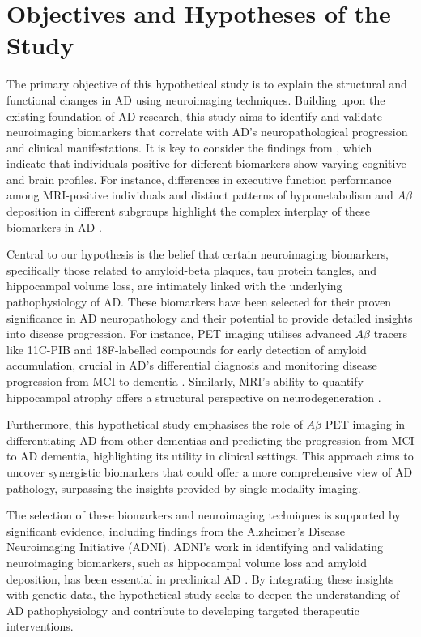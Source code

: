 \documentclass[10pt]{article}
\begin{document}
\begin{sloppypar}
  \section{Objectives and Hypotheses of the Study}
  \label{sec:objectives-and-hypotheses}

  The primary objective of this hypothetical study is to explain the structural and functional changes in AD using neuroimaging techniques. Building upon the existing foundation of AD research, this study aims to identify and validate neuroimaging biomarkers that correlate with AD’s neuropathological progression and clinical manifestations. It is key to consider the findings from \cite{besson_cognitive_2015}, which indicate that individuals positive for different biomarkers show varying cognitive and brain profiles. For instance, differences in executive function performance among MRI-positive individuals and distinct patterns of hypometabolism and $A\beta$ deposition in different subgroups highlight the complex interplay of these biomarkers in AD \citep{besson_cognitive_2015}.

  Central to our hypothesis is the belief that certain neuroimaging biomarkers, specifically those related to amyloid-beta plaques, tau protein tangles, and hippocampal volume loss, are intimately linked with the underlying pathophysiology of AD. These biomarkers have been selected for their proven significance in AD neuropathology and their potential to provide detailed insights into disease progression. For instance, PET imaging utilises advanced $A\beta$ tracers like 11C-PIB and 18F-labelled compounds for early detection of amyloid accumulation, crucial in AD’s differential diagnosis and monitoring disease progression from MCI to dementia \citep{bao_pet_2021}. Similarly, MRI’s ability to quantify hippocampal atrophy offers a structural perspective on neurodegeneration \citep{besson_cognitive_2015}.

  Furthermore, this hypothetical study emphasises the role of $A\beta$ PET imaging in differentiating AD from other dementias and predicting the progression from MCI to AD dementia, highlighting its utility in clinical settings. This approach aims to uncover synergistic biomarkers that could offer a more comprehensive view of AD pathology, surpassing the insights provided by single-modality imaging.

  The selection of these biomarkers and neuroimaging techniques is supported by significant evidence, including findings from the Alzheimer’s Disease Neuroimaging Initiative (ADNI). ADNI’s work in identifying and validating neuroimaging biomarkers, such as hippocampal volume loss and amyloid deposition, has been essential in preclinical AD \citep{saykin_genetic_2015}. By integrating these insights with genetic data, the hypothetical study seeks to deepen the understanding of AD pathophysiology and contribute to developing targeted therapeutic interventions.


\end{sloppypar}
\end{document}

